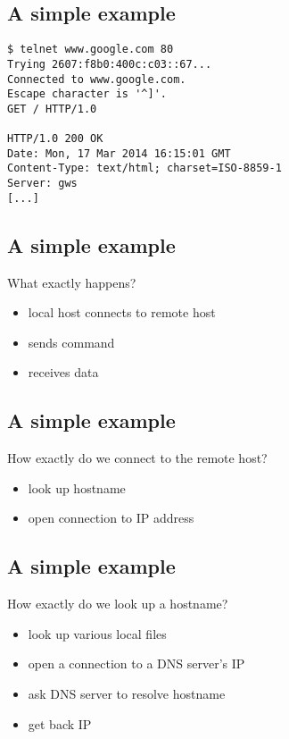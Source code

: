 \documentclass[xga]{xdvislides}
\begin{document}
\subsection{A simple example}
\Hugesize
\begin{center}
\begin{verbatim}
$ telnet www.google.com 80
Trying 2607:f8b0:400c:c03::67...
Connected to www.google.com.
Escape character is '^]'.
GET / HTTP/1.0

HTTP/1.0 200 OK
Date: Mon, 17 Mar 2014 16:15:01 GMT
Content-Type: text/html; charset=ISO-8859-1
Server: gws
[...]
\end{verbatim}
\end{center}
\Normalsize
\vspace*{\fill}


\subsection{A simple example}
What exactly happens?
\\
\begin{itemize}
	\item local host connects to remote host
	\item sends command
	\item receives data
\end{itemize}

\subsection{A simple example}
How exactly do we connect to the remote host?
\\
\begin{itemize}
	\item look up hostname
	\item open connection to IP address
\end{itemize}

\subsection{A simple example}
How exactly do we look up a hostname?
\\
\begin{itemize}
	\item look up various local files
	\item open a connection to a DNS server's IP
	\item ask DNS server to resolve hostname
	\item get back IP
\end{itemize}
\end{document}
